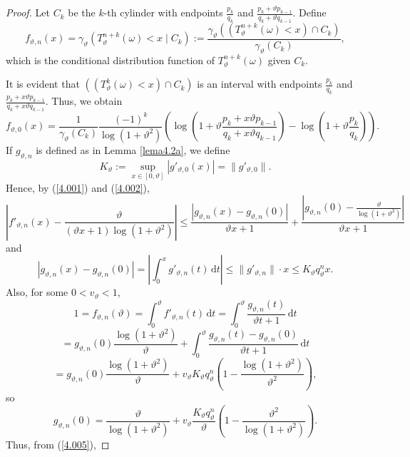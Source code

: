 \documentclass[final,1p,times]{elsarticle}
\numberwithin{equation}{section}
\begin{document}
\begin{proof}
Let \( C_k \) be the \( k \)-th cylinder with endpoints \( \frac{p_k}{q_k} \) and \( \frac{p_k + \vartheta p_{k-1}}{q_k + \vartheta q_{k-1}} \). Define
\[ f_{\vartheta, n}(x) = \gamma_{\vartheta} \left( T^{n+k}_{\vartheta}(\omega) < x \mid C_k \right) := \frac{\gamma_{\vartheta} \left( \left( T^{n+k}_{\vartheta}(\omega) < x \right) \cap C_k \right)}{\gamma_{\vartheta}(C_k)}, \]
which is the conditional distribution function of \( T^{n+k}_{\vartheta}(\omega) \) given \( C_k \).

It is evident that \( \left( \left( T^k_{\vartheta}(\omega) < x \right) \cap C_k \right) \) is an interval with endpoints \( \frac{p_k}{q_k} \) and \( \frac{p_k + x \vartheta p_{k-1}}{q_k + x \vartheta q_{k-1}} \). Thus, we obtain
\[
f_{\vartheta, 0}(x) = \frac{1}{\gamma_{\vartheta}(C_k)} \frac{(-1)^k}{\log\left(1 + \vartheta^2\right)} \left( \log\left( 1 + \vartheta \frac{p_k + x \vartheta p_{k-1}}{q_k + x \vartheta q_{k-1}} \right) - \log\left( 1 + \vartheta \frac{p_k}{q_k} \right) \right).
\]
If \( g_{\vartheta, n} \) is defined as in Lemma \ref{lema4.2a}, we define
\[
K_{\vartheta} := \sup_{x \in [0, \vartheta]} \left| g'_{\vartheta, 0}(x) \right| = \| g'_{\vartheta, 0} \|.
\]
Hence, by (\ref{4.001}) and (\ref{4.002}),
\begin{equation} \label{4.005}
\left| f'_{\vartheta, n}(x) - \frac{\vartheta}{(\vartheta x + 1)\log(1 + \vartheta^2)} \right| \leq \frac{\left| g_{\vartheta, n}(x) - g_{\vartheta, n}(0) \right|}{\vartheta x + 1} + \frac{\left| g_{\vartheta, n}(0) - \frac{\vartheta}{\log(1 + \vartheta^2)} \right|}{\vartheta x + 1}
\end{equation}
and
\[
\left| g_{\vartheta, n}(x) - g_{\vartheta, n}(0) \right| = \left| \int_0^x g'_{\vartheta, n}(t) \, \mathrm{d}t \right| \leq \| g'_{\vartheta, n} \| \cdot x \leq K_{\vartheta} q^n_{\vartheta} x.
\]
Also, for some \( 0 < v_{\vartheta} < 1 \),
\[
1 = f_{\vartheta, n}(\vartheta) = \int_0^{\vartheta} f'_{\vartheta, n}(t) \, \mathrm{d}t = \int_0^{\vartheta} \frac{g_{\vartheta,n}(t)}{\vartheta t + 1} \, \mathrm{d}t
\]
\[
= g_{\vartheta, n}(0) \frac{\log(1 + \vartheta^2)}{\vartheta} + \int_0^{\vartheta} \frac{g_{\vartheta, n}(t) - g_{\vartheta, n}(0)}{\vartheta t + 1} \, \mathrm{d}t
\]
\[
= g_{\vartheta, n}(0) \frac{\log(1 + \vartheta^2)}{\vartheta} + v_{\vartheta} K_{\vartheta} q^n_{\vartheta} \left( 1 - \frac{\log(1 + \vartheta^2)}{\vartheta^2} \right),
\]
so
\[
g_{\vartheta, n}(0) = \frac{\vartheta}{\log(1 + \vartheta^2)} + v_{\vartheta} \frac{K_{\vartheta} q^n_{\vartheta}}{\vartheta} \left( 1 - \frac{\vartheta^2}{\log(1 + \vartheta^2)} \right).
\]
Thus, from (\ref{4.005}),


\end{proof}
\end{document}
